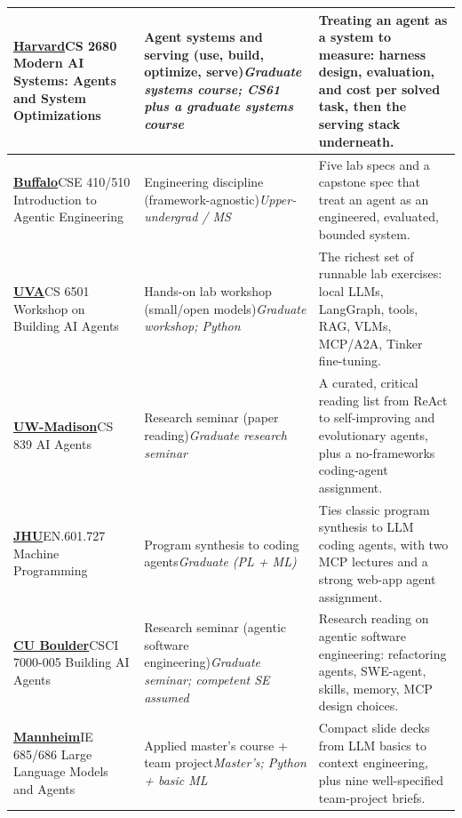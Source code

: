 \documentclass[10pt,oneside]{report}
\begin{document}
{\begin{longtable}{P{3.6cm} P{4.4cm} P{7.6cm}}
\hyperlink{course-HARV}{\textbf{Harvard}}\newline CS 2680 Modern AI Systems: Agents and System Optimizations & Agent systems and serving (use, build, optimize, serve)\newline\emph{Graduate systems course; CS61 plus a graduate systems course} & Treating an agent as a system to measure: harness design, evaluation, and cost per solved task, then the serving stack underneath.\\ \midrule
\hyperlink{course-UB}{\textbf{Buffalo}}\newline CSE 410/510 Introduction to Agentic Engineering & Engineering discipline (framework-agnostic)\newline\emph{Upper-undergrad / MS} & Five lab specs and a capstone spec that treat an agent as an engineered, evaluated, bounded system.\\ \midrule
\hyperlink{course-UVA}{\textbf{UVA}}\newline CS 6501 Workshop on Building AI Agents & Hands-on lab workshop (small/open models)\newline\emph{Graduate workshop; Python} & The richest set of runnable lab exercises: local LLMs, LangGraph, tools, RAG, VLMs, MCP/A2A, Tinker fine-tuning.\\ \midrule
\hyperlink{course-UW}{\textbf{UW-Madison}}\newline CS 839 AI Agents & Research seminar (paper reading)\newline\emph{Graduate research seminar} & A curated, critical reading list from ReAct to self-improving and evolutionary agents, plus a no-frameworks coding-agent assignment.\\ \midrule
\hyperlink{course-JHU}{\textbf{JHU}}\newline EN.601.727 Machine Programming & Program synthesis to coding agents\newline\emph{Graduate (PL + ML)} & Ties classic program synthesis to LLM coding agents, with two MCP lectures and a strong web-app agent assignment.\\ \midrule
\hyperlink{course-CU}{\textbf{CU Boulder}}\newline CSCI 7000-005 Building AI Agents & Research seminar (agentic software engineering)\newline\emph{Graduate seminar; competent SE assumed} & Research reading on agentic software engineering: refactoring agents, SWE-agent, skills, memory, MCP design choices.\\ \midrule
\hyperlink{course-MANN}{\textbf{Mannheim}}\newline IE 685/686 Large Language Models and Agents & Applied master's course + team project\newline\emph{Master's; Python + basic ML} & Compact slide decks from LLM basics to context engineering, plus nine well-specified team-project briefs.\\ \midrule

\end{longtable}}
\end{document}
